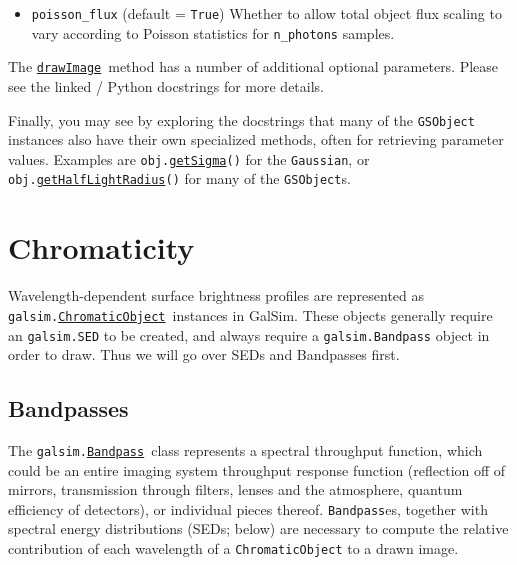 \documentclass[preprint,10pt]{../../devel/modules/aastex}
\newcommand\ChromaticObject{\href{http://galsim-developers.github.io/GalSim/classgalsim_1_1chromatic_1_1_chromatic_object.html}{\texttt{ChromaticObject}}}
\newcommand\drawImage{\href{http://galsim-developers.github.io/GalSim/classgalsim_1_1base_1_1_g_s_object.html\#aafe6ca9d84fe81543fbc105b897273db}{\texttt{drawImage}}}
\newcommand\Bandpass{\href{http://galsim-developers.github.io/GalSim/classgalsim_1_1bandpass_1_1_bandpass.html}{\texttt{Bandpass}}}
\begin{document}
\begin{itemize}
{\begin{itemize}
    dominated by the sky background, you can get away with using fewer
    shot photons than the full \texttt{n\_photons = flux}.  Essentially
    each shot photon can have a $\texttt{flux} > 1$, which increases the
    noise in each pixel.  The \texttt{max\_extra\_noise} parameter
    specifies how much extra noise per pixel is allowed because of this
    approximation.
  \item \texttt{poisson\_flux} (default = \texttt{True}) \newline
    Whether to allow total object flux scaling to vary according to
    Poisson statistics for \texttt{n\_photons} samples.
\end{itemize}
The \drawImage\ method has a number of additional optional
 parameters.  Please see the linked / Python docstrings for more
 details.
 }
\end{itemize}

Finally, you may see by exploring the docstrings that many of the \texttt{GSObject}
instances also have their own specialized methods, often for
retrieving parameter values. Examples are
  \texttt{obj.}\href{http://galsim-developers.github.io/GalSim/classgalsim_1_1base_1_1_gaussian.html#a418f2826a7b8934cfedc181de23ce826}{\texttt{getSigma}}\texttt{()}
for the \texttt{Gaussian}, or
  \texttt{obj.}\href{http://galsim-developers.github.io/GalSim/classgalsim_1_1base_1_1_sersic.html#ad6ca39293c6b478fc052d07ea51d086f}{\texttt{getHalfLightRadius}}\texttt{()}
for many of the \texttt{GSObject}s.

\section{Chromaticity}\label{sect:chromaticity}

Wavelength-dependent surface brightness profiles are represented as
\texttt{galsim.}\ChromaticObject\ instances in GalSim.
These objects generally require an \texttt{galsim.SED} to be created,
and always require a \texttt{galsim.Bandpass} object in order to draw.
Thus we will go over SEDs and Bandpasses first.

\subsection{Bandpasses}

The \texttt{galsim.}\Bandpass\ class represents a spectral throughput function, which could be an
entire imaging system throughput response function (reflection off of mirrors, transmission through
filters, lenses and the atmosphere, quantum efficiency of detectors), or individual pieces thereof.
\texttt{Bandpass}es, together with spectral energy distributions (SEDs; below) are necessary to
compute the relative contribution of each wavelength of a \texttt{ChromaticObject} to a drawn image.
\end{document}
